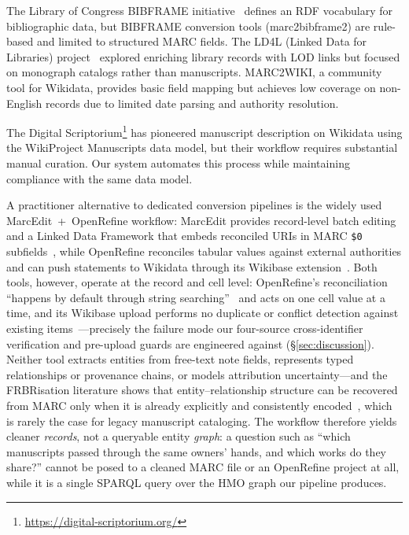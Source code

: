 \documentclass[Afour,sageh,times]{sagej}
\begin{document}
The Library of Congress BIBFRAME initiative~\cite{mcallister2017bibframe} defines an RDF vocabulary for bibliographic data, but BIBFRAME conversion tools (marc2bibframe2) are rule-based and limited to structured MARC fields. The LD4L (Linked Data for Libraries) project~\cite{cornell-ld4l} explored enriching library records with LOD links but focused on monograph catalogs rather than manuscripts. MARC2WIKI, a community tool for Wikidata, provides basic field mapping but achieves low coverage on non-English records due to limited date parsing and authority resolution.

The Digital Scriptorium\footnote{\url{https://digital-scriptorium.org/}} has pioneered manuscript description on Wikidata using the WikiProject Manuscripts data model, but their workflow requires substantial manual curation. Our system automates this process while maintaining compliance with the same data model.

A practitioner alternative to dedicated conversion pipelines is the widely used MarcEdit~+~OpenRefine workflow: MarcEdit provides record-level batch editing and a Linked Data Framework that embeds reconciled URIs in MARC \texttt{\$0} subfields~\cite{marcedit}, while OpenRefine reconciles tabular values against external authorities and can push statements to Wikidata through its Wikibase extension~\cite{openrefine-recon,openrefine-wikibase}. Both tools, however, operate at the record and cell level: OpenRefine's reconciliation ``happens by default through string searching''~\cite{openrefine-recon} and acts on one cell value at a time, and its Wikibase upload performs no duplicate or conflict detection against existing items~\cite{openrefine-wikibase}---precisely the failure mode our four-source cross-identifier verification and pre-upload guards are engineered against (\S\ref{sec:discussion}). Neither tool extracts entities from free-text note fields, represents typed relationships or provenance chains, or models attribution uncertainty---and the FRBRisation literature shows that entity--relationship structure can be recovered from MARC only when it is already explicitly and consistently encoded~\cite{aalberg2013}, which is rarely the case for legacy manuscript cataloging. The workflow therefore yields cleaner \emph{records}, not a queryable entity \emph{graph}: a question such as ``which manuscripts passed through the same owners' hands, and which works do they share?'' cannot be posed to a cleaned MARC file or an OpenRefine project at all, while it is a single SPARQL query over the HMO graph our pipeline produces.
\end{document}
